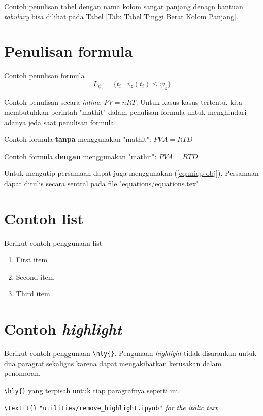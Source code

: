 Contoh penulisan tabel dengan nama kolom sangat panjang denagn bantuan \textit{tabulary} bisa dilihat pada Tabel \ref{Tab: Tabel Tinggi Berat Kolom Panjang}.

\section{Penulisan formula}
Contoh penulisan formula
\begin{equation}
L_{\psi_z} = \{ t_i \mid v_z(t_i) \le \psi_z \}
\end{equation}

Contoh penulisan secara \textit{inline}: $\mathit{PV = nRT}$. Untuk kasus-kasus tertentu, kita membutuhkan perintah "mathit" dalam penulisan formula untuk menghindari adanya jeda saat penulisan formula.

Contoh formula \textbf{tanpa} menggunakan "mathit": $PVA = RTD$

Contoh formula \textbf{dengan} menggunakan "mathit": $\mathit{PVA = RTD}$

Untuk mengutip persamaan dapat juga menggunakan (\ref{eq:miqp-obj}). Persamaan dapat ditulis secara sentral pada file "equations/equations.tex".
    


\section{Contoh list}
Berikut contoh penggunaan list
\begin{enumerate}
	\item First item
	\item Second item
	\item Third item
\end{enumerate}

\section{Contoh \textit{highlight}}
Berikut contoh penggunaan  \verb|\hly{}|. Pengunaan \textit{highlight} tidak disarankan untuk dua paragraf sekaligus karena dapat mengakibatkan kerusakan dalam penomoran.

 \verb|\hly{}| yang terpisah untuk tiap paragrafnya seperti ini.

 \verb|\textit{}|  \verb|"utilities/remove_highlight.ipynb"|  \textit{for the italic text} 
